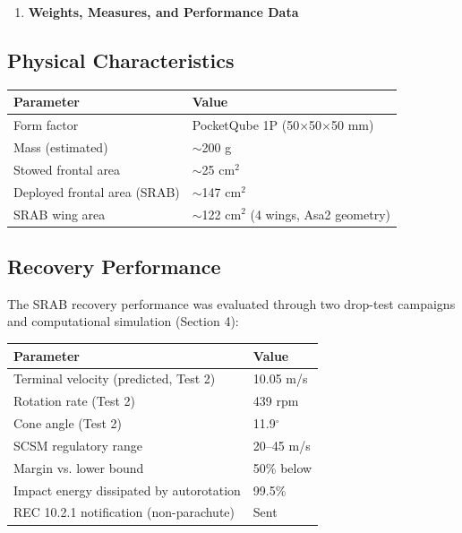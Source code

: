 \begin{enumerate}
\def\labelenumi{\arabic{enumi}.}
\setcounter{enumi}{2}
\item
  \textbf{Weights, Measures, and Performance Data}
\end{enumerate}

\subsection{Physical Characteristics}

\begin{center}
{\small
\setlength{\tabcolsep}{6pt}
\begin{tabular}{>{\raggedright}p{5.2cm}l}
\toprule
\textbf{Parameter} & \textbf{Value} \\
\midrule
Form factor & PocketQube 1P (50$\times$50$\times$50 mm) \\
Mass (estimated) & $\sim$200 g \\
Stowed frontal area & $\sim$25 cm$^2$ \\
Deployed frontal area (SRAB) & $\sim$147 cm$^2$ \\
SRAB wing area & $\sim$122 cm$^2$ (4 wings, Asa2 geometry) \\
\bottomrule
\end{tabular}
}
\end{center}


\subsection{Recovery Performance}

The SRAB recovery performance was evaluated through two drop-test
campaigns and computational simulation (Section 4):

\begin{center}
{\small
\setlength{\tabcolsep}{6pt}
\begin{tabular}{>{\raggedright}p{5.2cm}l}
\toprule
\textbf{Parameter} & \textbf{Value} \\
\midrule
Terminal velocity (predicted, Test 2) & 10.05 m/s \\
Rotation rate (Test 2) & 439 rpm \\
Cone angle (Test 2) & 11.9$^{\circ}$ \\
SCSM regulatory range & 20--45 m/s \\
Margin vs. lower bound & 50\% below \\
Impact energy dissipated by autorotation & 99.5\% \\
REC 10.2.1 notification (non-parachute) & Sent \\
\bottomrule
\end{tabular}
}
\end{center}

